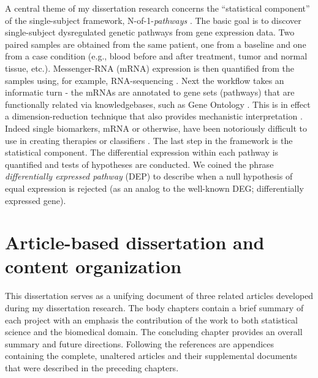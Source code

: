 \indent \indent A central theme of my dissertation research concerns the ``statistical component'' of the single-subject framework, N-of-1-\emph{pathways} \citep{Gardeux2014}. The basic goal is to discover single-subject dysregulated genetic pathways from gene expression data. Two paired samples are obtained from the same patient, one from a baseline and one from a case condition (e.g., blood before and after treatment, tumor and normal tissue, etc.). Messenger-RNA (mRNA) expression is then quantified from the samples using, for example, RNA-sequencing \citep{Wang2009}. Next the workflow takes an informatic turn - the mRNAs are annotated to gene sets (pathways) that are functionally related via knowledgebases, such as Gene Ontology \citep{Ashburner2000}. This is in effect a dimension-reduction technique that also provides mechanistic interpretation \citep{Mooney2015}. Indeed single biomarkers, mRNA or otherwise, have been notoriously difficult to use in creating therapies or classifiers \citep{Kern2012}. The last step in the framework is the statistical component. The differential expression within each pathway is quantified and tests of hypotheses are conducted. We coined the phrase \emph{differentially expressed pathway} (DEP) to describe when a null hypothesis of equal expression is rejected (as an analog to the well-known DEG; differentially expressed gene). 

\section{Article-based dissertation and content organization}\label{sec:org}
\indent \indent This dissertation serves as a unifying document of three related articles developed during my dissertation research. The body chapters contain a brief summary of each project with an emphasis the contribution of the work to both statistical science and the biomedical domain. The concluding chapter provides an overall summary and future directions. Following the references are appendices containing the complete, unaltered articles and their supplemental documents that were described in the preceding chapters.
